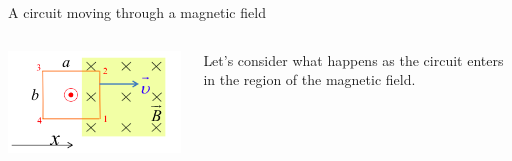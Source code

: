 \begin{frame}{A circuit moving through a magnetic field}

\begin{columns}
  \begin{column}{0.30\textwidth}
    \includegraphics[width=0.99\textwidth]{./images/schematics/circuit_moving_through_magnetic_field_left.png}\\
  \end{column}
  \begin{column}{0.70\textwidth}
    Let's consider what happens as the circuit enters in the region of the magnetic field.
  \end{column}
\end{columns}

\vspace{0.3cm}


\end{frame}
